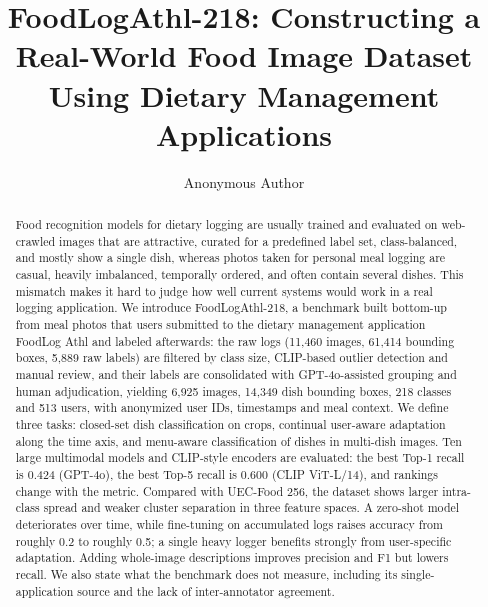 \documentclass[sigconf, nonacm]{acmart}
\begin{document}
\title{FoodLogAthl-218: Constructing a Real-World Food Image Dataset\\ Using Dietary Management Applications}

\author{Anonymous Author}

\begin{abstract}
Food recognition models for dietary logging are usually trained and evaluated on web-crawled images that are attractive, curated for a predefined label set, class-balanced, and mostly show a single dish, whereas photos taken for personal meal logging are casual, heavily imbalanced, temporally ordered, and often contain several dishes. This mismatch makes it hard to judge how well current systems would work in a real logging application. We introduce FoodLogAthl-218, a benchmark built bottom-up from meal photos that users submitted to the dietary management application FoodLog Athl and labeled afterwards: the raw logs (11,460 images, 61,414 bounding boxes, 5,889 raw labels) are filtered by class size, CLIP-based outlier detection and manual review, and their labels are consolidated with GPT-4o-assisted grouping and human adjudication, yielding 6,925 images, 14,349 dish bounding boxes, 218 classes and 513 users, with anonymized user IDs, timestamps and meal context. We define three tasks: closed-set dish classification on crops, continual user-aware adaptation along the time axis, and menu-aware classification of dishes in multi-dish images. Ten large multimodal models and CLIP-style encoders are evaluated: the best Top-1 recall is 0.424 (GPT-4o), the best Top-5 recall is 0.600 (CLIP ViT-L/14), and rankings change with the metric. Compared with UEC-Food 256, the dataset shows larger intra-class spread and weaker cluster separation in three feature spaces. A zero-shot model deteriorates over time, while fine-tuning on accumulated logs raises accuracy from roughly 0.2 to roughly 0.5; a single heavy logger benefits strongly from user-specific adaptation. Adding whole-image descriptions improves precision and F1 but lowers recall. We also state what the benchmark does not measure, including its single-application source and the lack of inter-annotator agreement.
\end{abstract}

\maketitle
\end{document}
